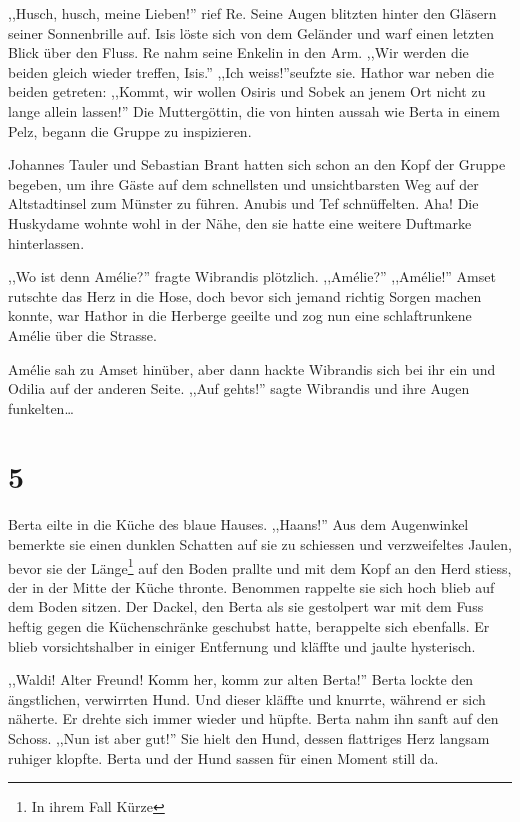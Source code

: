 ,,Husch, husch, meine Lieben!'' rief Re. Seine Augen blitzten hinter den Gläsern seiner Sonnenbrille auf. Isis löste sich von dem Geländer und warf einen letzten Blick über den Fluss. Re nahm seine Enkelin in den Arm. ,,Wir werden die beiden gleich wieder treffen, Isis.'' ,,Ich weiss!''seufzte sie. Hathor war neben die beiden getreten: ,,Kommt, wir wollen Osiris und Sobek an jenem Ort nicht zu lange allein lassen!'' Die Muttergöttin, die von hinten aussah wie Berta in einem Pelz, begann die Gruppe zu inspizieren.

Johannes Tauler und Sebastian Brant hatten sich schon an den Kopf der Gruppe begeben, um ihre Gäste auf dem schnellsten und unsichtbarsten Weg auf der Altstadtinsel zum Münster zu führen. Anubis und Tef schnüffelten. Aha! Die Huskydame wohnte wohl in der Nähe, den sie hatte eine weitere Duftmarke hinterlassen.

,,Wo ist denn Amélie?'' fragte Wibrandis plötzlich. ,,Amélie?'' ,,Amélie!'' Amset rutschte das Herz in die Hose, doch bevor sich jemand richtig Sorgen machen konnte, war Hathor in die Herberge geeilte und zog nun eine schlaftrunkene Amélie über die Strasse. 

Amélie sah zu Amset hinüber, aber dann hackte Wibrandis sich bei ihr ein und Odilia auf der anderen Seite. ,,Auf gehts!'' sagte Wibrandis und ihre Augen funkelten\dots 

\section*{5}

Berta eilte in die Küche des blaue Hauses. ,,Haans!'' Aus dem Augenwinkel bemerkte sie einen dunklen Schatten auf sie zu schiessen und verzweifeltes Jaulen, bevor sie der Länge\footnote{In ihrem Fall Kürze} auf den Boden prallte und mit dem Kopf an den Herd stiess, der in der Mitte der Küche thronte. Benommen rappelte sie sich hoch  blieb auf dem Boden sitzen. Der Dackel, den Berta als sie gestolpert war mit dem Fuss heftig gegen die Küchenschränke geschubst hatte, berappelte sich ebenfalls. Er blieb vorsichtshalber in einiger Entfernung und kläffte und jaulte hysterisch.

,,Waldi! Alter Freund! Komm her, komm zur alten Berta!'' Berta lockte den ängstlichen, verwirrten Hund. Und dieser kläffte und knurrte, während er sich näherte. Er drehte sich immer wieder und hüpfte. Berta nahm ihn sanft auf den Schoss. ,,Nun ist aber gut!'' Sie hielt den Hund, dessen flattriges Herz langsam ruhiger klopfte. Berta und der Hund sassen für einen Moment still da.


